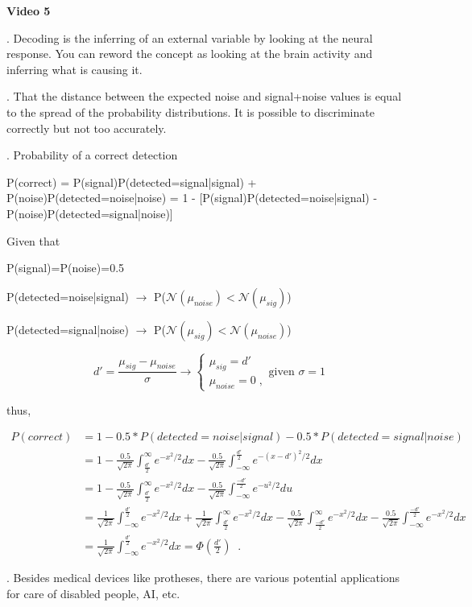 \documentclass[a4paper,12pt]{article}
\begin{document}
\vspace{0.5cm}

\noindent\normalsize\textbf{Video 5}


. Decoding is the inferring of an external variable by looking at the neural response. You can reword the concept as looking at the brain activity and inferring what is causing it.

. That the distance between the expected noise and signal+noise values is equal to the spread of the probability distributions. It is possible to discriminate correctly but not too accurately. 

. Probability of a correct detection 

P(correct) = P(signal)P(detected=signal|signal) + P(noise)P(detected=noise|noise) = 1 - [P(signal)P(detected=noise|signal) - P(noise)P(detected=signal|noise)]

Given that

P(signal)=P(noise)=0.5

P(detected=noise|signal) $\rightarrow$ P($\mathcal{N}(\mu_{noise})<\mathcal{N}(\mu_{sig})$)

P(detected=signal|noise) $\rightarrow$ P($\mathcal{N}(\mu_{sig})<\mathcal{N}(\mu_{noise})$)

$$
d' = \frac{\mu_{sig}-\mu_{noise}}{\sigma} \rightarrow \begin{cases} \mu_{sig} = d' \\ \mu_{noise} = 0 \;, \end{cases} \mbox{given } \sigma=1
$$

thus,

\begin{align*}
P(correct) &= 1 - 0.5*P(detected=noise|signal) - 0.5*P(detected=signal|noise) \\
&= 1 -\frac{0.5}{\sqrt{2\pi}}\int_{\frac{d'}{2}}^{\infty}e^{-x^2/2}dx- \frac{0.5}{\sqrt{2\pi}}\int_{-\infty}^{\frac{d'}{2}}e^{-(x-d')^2/2}dx \\
&= 1  -\frac{0.5}{\sqrt{2\pi}}\int_{\frac{d'}{2}}^{\infty}e^{-x^2/2}dx- \frac{0.5}{\sqrt{2\pi}}\int_{-\infty}^{\frac{-d'}{2}}e^{-u^2/2}du\\
&= \frac{1}{\sqrt{2\pi}}\int_{-\infty}^{\frac{d'}{2}}e^{-x^2/2}dx + \frac{1}{\sqrt{2\pi}}\int_{\frac{d'}{2}}^{\infty}e^{-x^2/2}dx-\frac{0.5}{\sqrt{2\pi}}\int_{\frac{-d'}{2}}^{\infty}e^{-x^2/2}dx  - \frac{0.5}{\sqrt{2\pi}}\int_{-\infty}^{\frac{-d'}{2}}e^{-x^2/2}dx\\
&=\frac{1}{\sqrt{2\pi}}\int_{-\infty}^{\frac{d'}{2}}e^{-x^2/2}dx=\Phi(\frac{d'}{2})\;\;.
\end{align*}

. Besides medical devices like protheses, there are various potential applications for care of disabled people, AI, etc.
\end{document}
